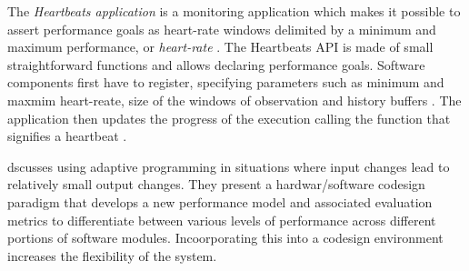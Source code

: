 The \emph{Heartbeats application} is a monitoring application which makes it possible to assert performance goals as heart-rate windows delimited by a minimum and maximum performance, or \emph{heart-rate} \cite{evolvable}. The Heartbeats API is made of small straightforward functions and allows declaring performance goals. Software components first have to register, specifying parameters such as minimum and maxmim heart-reate, size of the windows of observation and history buffers \cite{selfaware}. The application then updates the progress of the execution calling the function that signifies a heartbeat \cite{evolvable}.


\cite{reconfigurable} dscusses using adaptive programming in situations where input changes lead to relatively small output changes. They present a hardwar/software codesign paradigm that develops a new performance model and associated evaluation metrics to differentiate between various levels of performance across different portions of software modules. Incoorporating this into a codesign environment increases the flexibility of the system. 
